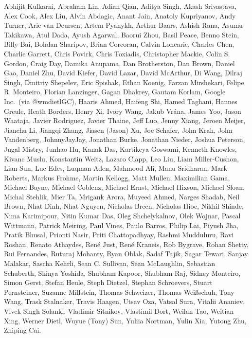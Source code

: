 Abhijit Kulkarni,
Abraham Lin,
Adian Qian,
Aditya Singh,
Akash Srivastava,
Alex Cook,
Alex Liu,
Alvin Abdagic,
Anant Jain,
Anatoly Kupriyanov,
Andy Turner,
Arie van Deursen,
Artem Pyanykh,
Arthur Baars,
Ashish Rana,
Asumu Takikawa,
Atul Dada,
Ayush Agarwal,
Baorui Zhou,
Basil Peace,
Benno Stein,
Billy Bai,
Bohdan Sharipov,
Brian Corcoran,
Calvin Loncaric,
Charles Chen,
Charlie Garrett,
Chris Povirk,
Chris Toxiadis,
Christopher Mackie,
Colin S. Gordon,
Craig Day,
Damika Anupama,
Dan Brotherston,
Dan Brown,
Daniel Gao,
Daniel Zhu,
David Kiefer,
David Lazar,
David McArthur,
Di Wang,
Dilraj Singh,
Dmitriy Shepelev,
Eric Spishak,
Ethan Koenig,
Farzan Mirshekari,
Felipe R. Monteiro,
Florian Lanzinger,
Gagan Dhakrey,
Gautam Korlam,
Google Inc.\ (via @wmdietlGC),
Haaris Ahmed,
Haifeng Shi,
Hamed Taghani,
Hannes Greule,
Heath Borders,
Henry Xi,
Ivory Wang,
Jakub Vr\'ana,
James Yoo,
Jason Waataja,
Javier Rodriguez,
Javier Thaine,
Jeff Luo,
Jenny Xiang,
Jeroen Meijer,
Jianchu Li,
Jiangqi Zhang,
Jiasen (Jason) Xu,
Joe Schafer,
John Krah,
John Vandenberg,
JohnnyJayJay,
Jonathan Burke,
Jonathan Nieder,
Joshua Peterson,
Jugal Mistry,
Junhao Hu,
Kanak Das,
Kartikeya Goswami,
Kenneth Knowles,
Kivanc Muslu,
Konstantin Weitz,
Lazaro Clapp,
Leo Liu,
Liam Miller-Cushon,
Lian Sun,
Luc Edes,
Luqman Aden,
Mahmood Ali,
Manu Sridharan,
Mark Roberts,
Markus Frohme,
Martin Kellogg,
Matt Mullen,
Maximilian Gama,
Michael Bayne,
Michael Coblenz,
Michael Ernst,
Michael Hixson,
Michael Sloan,
Michal Stehlik,
Mier Ta,
Mrigank Arora,
Muyeed Ahmed,
Narges Shadab,
Neil Brown,
Nhat Dinh,
Nhat Nguyen,
Nicholas Breen,
Nicholas Hioe,
Nikhil Shinde,
Nima Karimipour,
Nitin Kumar Das,
Oleg Shchelykalnov,
Olek Wojnar,
Pascal Wittmann,
Patrick Meiring,
Paul Vines,
Paulo Barros,
Philip Lai,
Piyush Jha,
Pratik Bhusal,
Prionti Nasir,
Priti Chattopadhyay,
Rashmi Mudduluru,
Ravi Roshan,
Renato Athaydes,
Ren\'e Just,
Ren\'e Kraneis,
Rob Bygrave,
Rohan Shetty,
Rui Fernandes,
Ruturaj Mohanty,
Ryan Oblak,
Sadaf Tajik,
Sagar Tewari,
Sanjay Malakar,
Sascha Kehrli,
Sean C. Sullivan,
Sean McLaughlin,
Sebastian Schuberth,
Shinya Yoshida,
Shubham Kapoor,
Shubham Raj,
Sidney Monteiro,
Simon Gerst,
Stefan Heule,
Steph Dietzel,
Stephan Schroevers,
Stuart Pernsteiner,
Suzanne Millstein,
Thomas Schweizer,
Thomas Wei\ss schuh,
Tony Wang,
Trask Stalnaker,
Travis Haagen,
Utsav Oza,
Vatsal Sura,
Vitalii Ananiev,
Vivek Singh Solanki,
Vladimir Sitnikov,
Vlastimil Dort,
Weilan Tao,
Weitian Xing,
Werner Dietl,
Wuyue (Tony) Sun,
Yuliia Nortman,
Yulin Xia,
Yutong Zhu,
Zhiping Cai.
